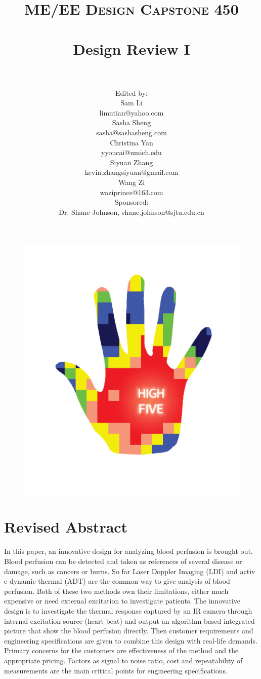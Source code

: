 \documentclass[paper=letter, fontsize=11pt]{scrartcl}
\title{
		\vspace{-1in} 	
		\usefont{OT1}{bch}{b}{n}
		\normalfont \normalsize \textsc{ME/EE Design Capstone 450} \\ [25pt]
		\horrule{0.5pt} \\[0.4cm]
		\huge Design Review I \\
		\horrule{2pt} \\[0.5cm]
}
\author{
        \normalfont 							
        \normalsize
        Edited by: \\
        Sam Li \\ limutian@yahoo.com \\[2pt]
        Sasha Sheng \\ sasha@sashasheng.com\\[2pt]
        Christina Yan \\ yyoucai@umich.edu\\[2pt]
        Siyuan Zhang\\ kevin.zhangsiyuan@gmail.com\\[2pt]
        Wang Zi \\ waziprince@163.com\\ [2pt]
         Sponsored: \\ Dr. Shane Johnson,  shane.johnson@sjtu.edu.cn\\ \vspace{0.5cm}
}
\numberwithin{equation}{section}		%
\numberwithin{figure}{section}			%
\numberwithin{table}{section}			%
\begin{document}
\maketitle
\begin{figure}[H]
    \centering
    \includegraphics[scale=0.7]{LOGO.png}
\end{figure}
\pagebreak
\tableofcontents
\pagebreak
	
\section{Revised Abstract}	
In this paper, an innovative design for analyzing blood perfusion is brought out. Blood perfusion can be detected and
taken as references of several disease or damage, such as cancers or burns. So far Laser Doppler Imaging (LDI) and activ
e dynamic thermal (ADT) are the common way to give analysis of blood perfusion.  Both of these two methods own their 
limitations, either much expensive or need external excitation to investigate patients. The innovative design is to 
investigate the thermal response captured by an IR camera through internal excitation source (heart beat) and output an 
algorithm-based integrated picture that show the blood perfusion directly. Then customer requirements and engineering 
specifications are given to combine this design with real-life demands. Primary concerns for the customers are effectiveness
of the method and the appropriate pricing. Factors as signal to noise ratio, cost and repeatability of measurements are the
main critical points for engineering specifications.
\end{document}
